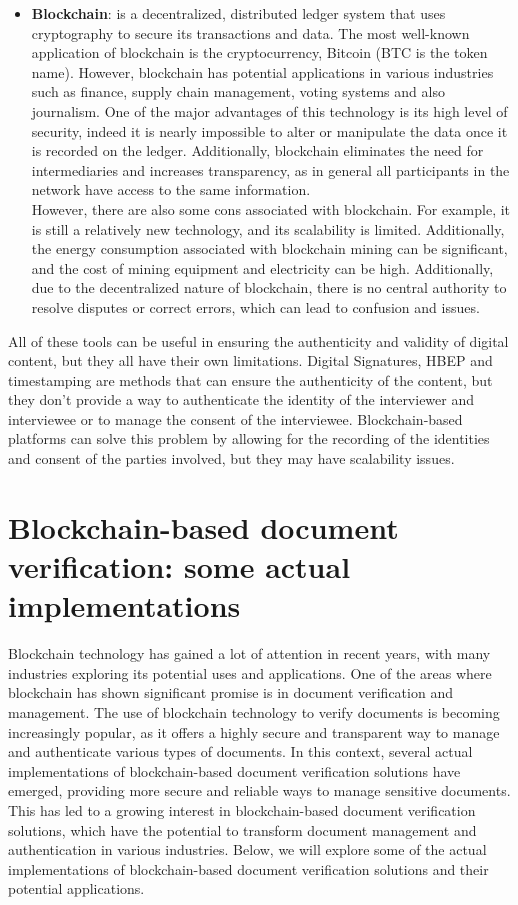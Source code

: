 \documentclass[target=mst,aauheader=]{thud}
\begin{document}
\begin{itemize}
    \item \textbf{Blockchain}: is a decentralized, distributed ledger system that uses cryptography to secure its transactions and data. The most well-known application of blockchain is the cryptocurrency, Bitcoin (BTC is the token name). However, blockchain has potential applications in various industries such as finance, supply chain management, voting systems and also journalism. One of the major advantages of this technology is its high level of security, indeed it is nearly impossible to alter or manipulate the data once it is recorded on the ledger. Additionally, blockchain eliminates the need for intermediaries and increases transparency, as in general all participants in the network have access to the same information.\\However, there are also some cons associated with blockchain. For example, it is still a relatively new technology, and its scalability is limited. Additionally, the energy consumption associated with blockchain mining can be significant, and the cost of mining equipment and electricity can be high. Additionally, due to the decentralized nature of blockchain, there is no central authority to resolve disputes or correct errors, which can lead to confusion and issues.

\end{itemize}

All of these tools can be useful in ensuring the authenticity and validity of digital content, but they all have their own limitations.
Digital Signatures, HBEP and timestamping are methods that can ensure the authenticity of the content, but they don't provide a way to authenticate the identity of the interviewer and interviewee or to manage the consent of the interviewee. Blockchain-based platforms can solve this problem by allowing for the recording of the identities and consent of the parties involved, but they may have scalability issues.\\


\section{Blockchain-based document verification: some actual implementations}

Blockchain technology has gained a lot of attention in recent years, with many industries exploring its potential uses and applications. One of the areas where blockchain has shown significant promise is in document verification and management. The use of blockchain technology to verify documents is becoming increasingly popular, as it offers a highly secure and transparent way to manage and authenticate various types of documents. In this context, several actual implementations of blockchain-based document verification solutions have emerged, providing more secure and reliable ways to manage sensitive documents. This has led to a growing interest in blockchain-based document verification solutions, which have the potential to transform document management and authentication in various industries. Below, we will explore some of the actual implementations of blockchain-based document verification solutions and their potential applications.
\end{document}
